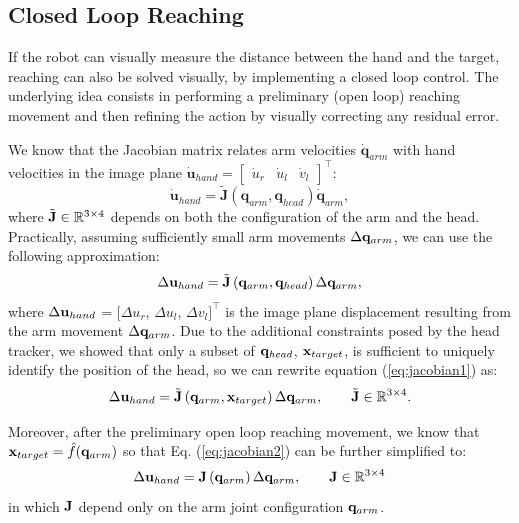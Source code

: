 \subsection{Closed Loop Reaching} \label{Eq:ClosedLoop}
%
If the robot can visually measure the distance
between the hand and the target, reaching can also be solved
visually, by implementing a closed loop control. The underlying idea consists in
performing a preliminary (open loop) reaching movement and then refining the action
by visually correcting any residual error. 

We know that the Jacobian matrix relates arm velocities $\dot {\mathbf q}_{arm}$
with hand velocities in the image plane $\dot {\mathbf u}_{hand} = \left[ 
\begin{array}{ccc}
  \dot u_r & \dot u_l & \dot v_{l}
\end{array} \right]^\top$:
\begin{equation} 
  \dot {\mathbf u}_{hand}=
  \tilde{\mathbf J}\left(\mathbf q_{arm}, \mathbf q_{head}\right)
  \dot {\mathbf q}_{arm},
\end{equation}
where $\tilde{\mathbf J} \in \mathbb R^{3 \times 4}$ depends on 
both the configuration of the arm and the head. Practically, assuming 
sufficiently small arm movements $\Delta \mathbf {q}_{arm}$, we can use the following 
approximation:
%
\begin{equation} 
\label{eq:jacobian1}
  \Delta \mathbf {u}_{hand}=
  \tilde{\mathbf J}\left(\mathbf q_{arm}, \mathbf q_{head}\right)
  \Delta \mathbf {q}_{arm},
\end{equation}
where $\Delta \mathbf {u}_{hand}$ = $[ \Delta u_r$, $\Delta u_l$, $\Delta v_{l}]^\top$
is the image plane displacement resulting from the arm movement $\Delta \mathbf {q}_{arm}$. 
Due to the additional constraints posed by the head tracker, we showed
that only a subset of $\mathbf{q}_{head}$, $\mathbf{x}_{target}$, is 
sufficient to uniquely identify the position of the head, so we 
can rewrite equation (\ref{eq:jacobian1}) as:
%
\begin{equation}
\label{eq:jacobian2}
  \Delta \mathbf {u}_{hand}=
  \tilde{\mathbf J}\left(\mathbf q_{arm}, \mathbf{x}_{target}\right)
  \Delta \mathbf {q}_{arm}, \qquad \tilde{\mathbf J} \in \mathbb R^{3 \times 4}.
\end{equation}
%

Moreover, after the preliminary open loop reaching movement, we know
that $\mathbf{x}_{target} = \hat f(\mathbf q_{arm})$ so that  Eq.
(\ref{eq:jacobian2}) can be further simplified to:
%
\begin{equation} 
\label{eq:jacobian3}
  \Delta \mathbf {u}_{hand}=
  \mathbf J \left(\mathbf q_{arm}\right)
  \Delta \mathbf {q}_{arm},\qquad \mathbf J \in \mathbb R^{3\times4}
\end{equation}
%
in which $\mathbf J$ depend only on the arm joint configuration $\mathbf q_{arm}$.

